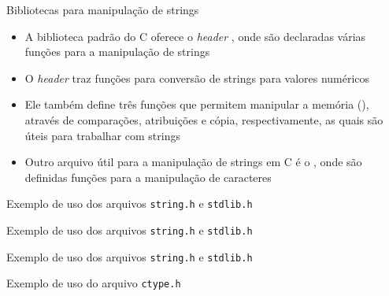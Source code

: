 \begin{frame}[fragile]{Bibliotecas para manipulação de strings}

    \begin{itemize}
        \item A biblioteca padrão do C oferece o \textit{header} , onde são 
            declaradas várias funções para a manipulação de strings
        \pause

        \item O \textit{header}  traz funções para conversão de strings para 
            valores numéricos
        \pause

        \item Ele também define três funções que permitem manipular a memória 
        (), através de comparações, atribuições e cópia, 
            respectivamente, as quais são úteis para trabalhar com strings
        \pause

        \item Outro arquivo útil para a manipulação de strings em C é o , onde 
            são definidas funções para a manipulação de caracteres
    \end{itemize}

\end{frame}

\begin{frame}[fragile]{Exemplo de uso dos arquivos \texttt{string.h} e \texttt{stdlib.h}}
\end{frame}

\begin{frame}[fragile]{Exemplo de uso dos arquivos \texttt{string.h} e \texttt{stdlib.h}}
\end{frame}

\begin{frame}[fragile]{Exemplo de uso dos arquivos \texttt{string.h} e \texttt{stdlib.h}}
\end{frame}

\begin{frame}[fragile]{Exemplo de uso do arquivo \texttt{ctype.h}}
\end{frame}
